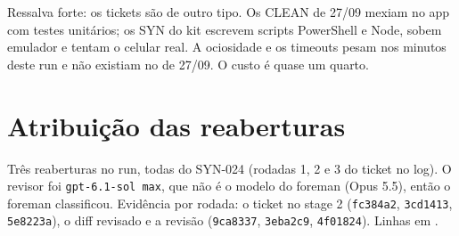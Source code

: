 \documentclass[11pt,a4paper]{article}
\begin{document}
\medskip
{}

\medskip
Ressalva forte: os tickets são de outro tipo. Os CLEAN de 27/09 mexiam no app
com testes unitários; os SYN do kit escrevem scripts PowerShell e Node, sobem
emulador e tentam o celular real. A ociosidade e os timeouts pesam nos minutos
deste run e não existiam no de 27/09. O custo é quase um quarto.

\section{Atribuição das reaberturas}

Três reaberturas no run, todas do SYN-024 (rodadas 1, 2 e 3 do ticket no
log). O revisor foi \texttt{gpt-6.1-sol max}, que não é o modelo do foreman
(Opus 5.5), então o foreman classificou. Evidência por rodada: o ticket no
stage 2 (\texttt{fc384a2}, \texttt{3cd1413}, \texttt{5e8223a}), o diff
revisado e a revisão (\texttt{9ca8337}, \texttt{3eba2c9}, \texttt{4f01824}).
Linhas em .
\end{document}

